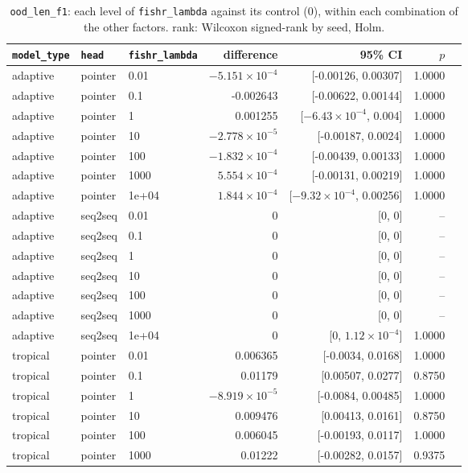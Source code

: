 \documentclass[10pt]{article}
\begin{document}
{\small
\begin{longtable}{lllrrrl}
\caption{\texttt{ood\_len\_f1}: each level of \texttt{fishr\_lambda} against its control (0), within each combination of the other factors. rank: Wilcoxon signed-rank by seed, Holm.}\label{tab:control-ood_len_f1}\\
\toprule
\texttt{model\_type} & \texttt{head} & \texttt{fishr\_lambda} & difference & 95\% CI & $p$ & \\
\midrule
\endhead
adaptive & pointer & 0.01 & $-5.151\times10^{-4}$ & [-0.00126, 0.00307] & 1.0000 & \\
adaptive & pointer & 0.1 & -0.002643 & [-0.00622, 0.00144] & 1.0000 & \\
adaptive & pointer & 1 & 0.001255 & [$-6.43\times10^{-4}$, 0.004] & 1.0000 & \\
adaptive & pointer & 10 & $-2.778\times10^{-5}$ & [-0.00187, 0.0024] & 1.0000 & \\
adaptive & pointer & 100 & $-1.832\times10^{-4}$ & [-0.00439, 0.00133] & 1.0000 & \\
adaptive & pointer & 1000 & $5.554\times10^{-4}$ & [-0.00131, 0.00219] & 1.0000 & \\
adaptive & pointer & 1e+04 & $1.844\times10^{-4}$ & [$-9.32\times10^{-4}$, 0.00256] & 1.0000 & \\
adaptive & seq2seq & 0.01 & 0 & [0, 0] & -- & \\
adaptive & seq2seq & 0.1 & 0 & [0, 0] & -- & \\
adaptive & seq2seq & 1 & 0 & [0, 0] & -- & \\
adaptive & seq2seq & 10 & 0 & [0, 0] & -- & \\
adaptive & seq2seq & 100 & 0 & [0, 0] & -- & \\
adaptive & seq2seq & 1000 & 0 & [0, 0] & -- & \\
adaptive & seq2seq & 1e+04 & 0 & [0, $1.12\times10^{-4}$] & 1.0000 & \\
tropical & pointer & 0.01 & 0.006365 & [-0.0034, 0.0168] & 1.0000 & \\
tropical & pointer & 0.1 & 0.01179 & [0.00507, 0.0277] & 0.8750 & \\
tropical & pointer & 1 & $-8.919\times10^{-5}$ & [-0.0084, 0.00485] & 1.0000 & \\
tropical & pointer & 10 & 0.009476 & [0.00413, 0.0161] & 0.8750 & \\
tropical & pointer & 100 & 0.006045 & [-0.00193, 0.0117] & 1.0000 & \\
tropical & pointer & 1000 & 0.01222 & [-0.00282, 0.0157] & 0.9375 & \\

\end{longtable}}
\end{document}

